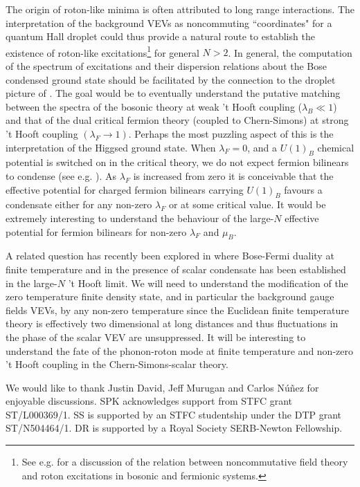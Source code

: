 The  origin of roton-like minima is often attributed to long range interactions. The interpretation of the background VEVs as noncommuting ``coordinates" for a quantum Hall droplet could thus provide a natural route to establish the existence of roton-like excitations\footnote{See e.g. \cite{Castorina:2004yd} for a discussion of the relation between noncommutative field theory and roton excitations in bosonic and fermionic systems.} for general $N>2$.  In general, the computation of the spectrum of excitations and their dispersion relations about the Bose condensed ground state should be facilitated by the connection to the droplet picture of \cite{hep-th/0103013}. The goal would be to eventually understand the putative matching between the  spectra of the bosonic theory at weak 't Hooft coupling ($\lambda_B\ll 1$) and that of the dual critical fermion theory (coupled to Chern-Simons) at strong 't Hooft coupling $(\lambda_F\to 1)$. Perhaps the most puzzling aspect of this is the interpretation of the Higgsed ground state. When $\lambda_F=0$, and a $U(1)_B$ chemical potential is switched on in the critical theory, we do not  expect fermion bilinears to condense (see e.g. \cite{Hands:1998he}). As $\lambda_F$ is increased from zero it is conceivable that the effective potential for charged fermion bilinears carrying $U(1)_B$ favours a condensate either for any non-zero $\lambda_F$ or at some critical value. It would be extremely interesting to understand the behaviour of the large-$N$ effective potential for fermion bilinears for non-zero $\lambda_F$ and $\mu_B$.



 A related question has recently been explored in \cite{Choudhury:2018iwf} where Bose-Fermi duality at finite temperature and in the presence of scalar condensate has been established in the large-$N$ 't Hooft limit. We will need to understand  the modification of the zero temperature finite density state, and in particular the background gauge fields VEVs, by any non-zero temperature since the  Euclidean finite temperature theory is effectively two dimensional at long distances and thus fluctuations in the  phase of the scalar VEV are unsuppressed.  It will be interesting to understand the fate of the phonon-roton mode at finite temperature and non-zero 't Hooft coupling in the Chern-Simons-scalar theory.


\acknowledgments We would like to thank Justin David, Jeff Murugan and Carlos N\'u\~nez for  enjoyable discussions.
SPK acknowledges support from STFC grant ST/L000369/1. SS is supported by an STFC studentship under the DTP grant ST/N504464/1. DR is supported by a Royal Society SERB-Newton Fellowship.
\newpage

